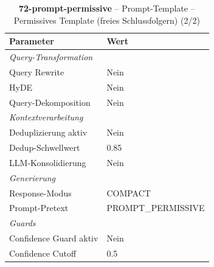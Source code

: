 \begin{table}[H]
\centering
\small
\setlength{\tabcolsep}{4pt}
\begin{tabular}{lp{8cm}}
\toprule
\textbf{Parameter} & \textbf{Wert} \\
\midrule
\multicolumn{2}{l}{\textit{Query-Transformation}} \\
\midrule
\quad Query Rewrite & Nein \\
\quad HyDE & Nein \\
\quad Query-Dekomposition & Nein \\
\midrule
\multicolumn{2}{l}{\textit{Kontextverarbeitung}} \\
\midrule
\quad Deduplizierung aktiv & Nein \\
\quad Dedup-Schwellwert & 0.85 \\
\quad LLM-Konsolidierung & Nein \\
\midrule
\multicolumn{2}{l}{\textit{Generierung}} \\
\midrule
\quad Response-Modus & COMPACT \\
\quad Prompt-Pretext & PROMPT\_PERMISSIVE \\
\midrule
\multicolumn{2}{l}{\textit{Guards}} \\
\midrule
\quad Confidence Guard aktiv & Nein \\
\quad Confidence Cutoff & 0.5 \\
\bottomrule
\end{tabular}
\caption{\textbf{72-prompt-permissive} -- Prompt-Template -- Permissives Template (freies Schlussfolgern) (2/2)}
\label{tab:config_72_prompt_permissive_b}
\end{table}